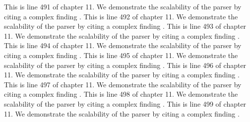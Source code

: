 This is line 491 of chapter 11. We demonstrate the scalability of the parser by citing a complex finding \cite{ref11_491}.
This is line 492 of chapter 11. We demonstrate the scalability of the parser by citing a complex finding \cite{ref11_492}.
This is line 493 of chapter 11. We demonstrate the scalability of the parser by citing a complex finding \cite{ref11_493}.
This is line 494 of chapter 11. We demonstrate the scalability of the parser by citing a complex finding \cite{ref11_494}.
This is line 495 of chapter 11. We demonstrate the scalability of the parser by citing a complex finding \cite{ref11_495}.
This is line 496 of chapter 11. We demonstrate the scalability of the parser by citing a complex finding \cite{ref11_496}.
This is line 497 of chapter 11. We demonstrate the scalability of the parser by citing a complex finding \cite{ref11_497}.
This is line 498 of chapter 11. We demonstrate the scalability of the parser by citing a complex finding \cite{ref11_498}.
This is line 499 of chapter 11. We demonstrate the scalability of the parser by citing a complex finding \cite{ref11_499}.
